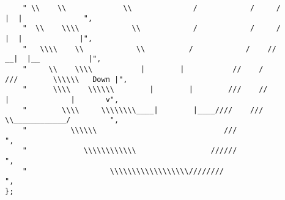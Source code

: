 \begin{lstlisting}
	" \\    \\             \\              /            /     /           |  |              ",
	"  \\    \\\\            \\            /            /     /            |  |             |",
	"   \\\\    \\            \\          /            /    //           __|  |__           |",
	"     \\    \\\\           |        |           //    /          ///        \\\\\\   Down |",
	"      \\\\    \\\\\\        |        |        ///    //          |              |       v",
	"        \\\\     \\\\\\\\____|        |____////    ///             \\____________/         ",
	"          \\\\\\                             ///                                       ",
	"             \\\\\\\\\\\\                 //////                                          ",
	"                   \\\\\\\\\\\\\\\\\\////////                                                ",
};


\end{lstlisting}

